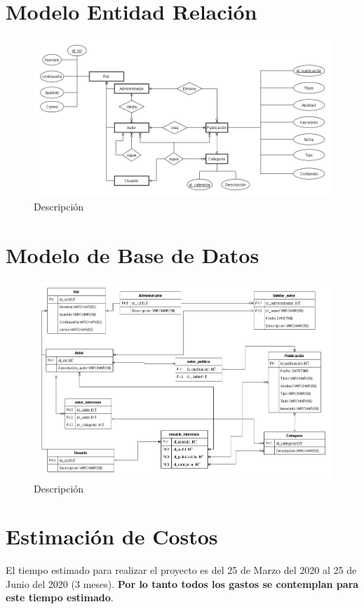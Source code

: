 \documentclass[a4paper,12 pt]{article}
\begin{document}
\begin{landscape}
\section{Modelo Entidad Relación}
    \begin{figure}[H]
        \centering
        \includegraphics[scale = 0.7]{images/ERD.png}
        \caption{Descripción}
        \label{F13}
    \end{figure}{}

\section{Modelo de Base de Datos}
    \begin{figure}[H]
        \centering
        \includegraphics[scale = 0.55]{images/Diagr_BD.png}
        \caption{Descripción}
        \label{F11}
    \end{figure}{}
\end{landscape}

\section{Estimación de Costos}
El tiempo estimado para realizar el proyecto es del 25 de Marzo del 2020 al 25
de Junio del 2020 (3 meses). \textbf{Por lo tanto todos los gastos se contemplan
para este tiempo estimado}.\\
\end{document}
